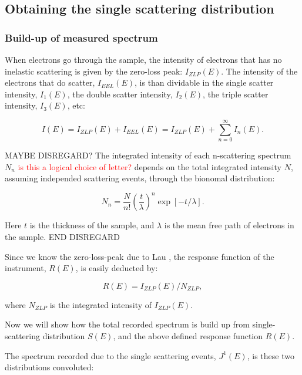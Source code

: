 \newpage
\subsection{Obtaining the single scattering distribution}

\subsubsection{Build-up of measured spectrum}
When electrons go through the sample, the intensity of electrons that has no inelastic scattering is given by the zero-loss peak: $I_{ZLP}(E)$. The intensity of the electrons that do scatter, $I_{EEL}(E)$, is than dividable in the single scatter intensity, $I_1(E)$, the double scatter intensity, $I_2(E)$, the triple scatter intensity, $I_3(E)$, etc:

\begin{equation}\label{eq_I}
    I(E) = I_{ZLP}(E) + I_{EEL}(E) = I_{ZLP}(E) + \sum_{n=0}^\infty I_n(E).
\end{equation}


MAYBE DISREGARD?
The integrated intensity of each n-scattering spectrum $N_n$ \textcolor{red}{is this a logical choice of letter?} depends on the total integrated intensity $N$, assuming independed scattering events, through the bionomal distribution:

\begin{equation}\label{eq_N_n}
    N_n =  \frac{N}{n!} \left(\frac{t}{\lambda}\right)^n \exp{[-t/\lambda]} .
\end{equation}

Here $t$ is the thickness of the sample, and $\lambda$ is the mean free path of electrons in the sample. 
END DISREGARD

Since we know the zero-loss-peak due to Lau \cite{lau}, the response function of the instrument, $R(E)$, is easily deducted by:

\begin{equation}
    R(E) = I_{ZLP}(E)/N_{ZLP},
\end{equation}

where $N_{ZLP}$ is the integrated intensity of $I_{ZLP}(E)$. 


Now we will show how the total recorded spectrum is build up from single-scattering distribution $S(E)$, and the above defined response function $R(E)$. 


The spectrum recorded due to the single scattering events, $J^1(E)$, is these two distributions convoluted:

